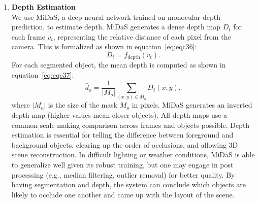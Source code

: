 \documentclass[12pt,a4paper]{report}
\theoremstyle{definition}
\theoremstyle{remark}
\begin{document}
\begin{enumerate}
    \item \textbf{Depth Estimation}\\
    We use MiDaS, a deep neural network trained on monocular depth prediction, to estimate depth. MiDaS generates a dense depth map $D_t$ for each frame $v_t$, representing the relative distance of each pixel from the camera.  This is formalized as shown in equation~\ref{eq:eqc36}:
    \begin{equation}
    \label{eq:eqc36}
    D_t = f_{\text{depth}}(v_t).
    \end{equation}
    For each segmented object, the mean depth is computed as shown in equation~\ref{eq:eqc37}:
    \begin{equation}
    \label{eq:eqc37}
    \bar{d}_o = \frac{1}{|M_o|} \sum_{(x,y) \in M_o} D_t(x,y),
    \end{equation}
    where $|M_o|$ is the size of the mask $M_o$ in pixels. MiDaS generates an inverted depth map (higher values mean closer objects). All depth maps use a common scale making comparison across frames and objects possible. Depth estimation is essential for telling the difference between foreground and background objects, clearing up the order of occlusions,  and allowing 3D scene reconstruction. In difficult lighting or weather conditions, MiDaS is able to generalize well given its robust training, but one may engage in post processing (e.g., median filtering, outlier removal) for better quality. By having segmentation and depth, the system can conclude which objects are likely to occlude one another and came up with the layout of the scene.


\end{enumerate}
\end{document}
